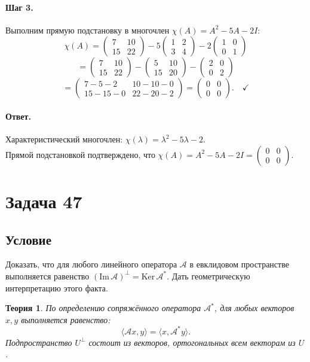 \documentclass[12pt,a4paper]{article}
\theoremstyle{solution}
\newtheorem*{theory}{Теория}
\newcommand{\task}[1]{\newpage\section*{Задача #1}}
\newcommand{\answer}{\paragraph{Ответ.}}
\newcommand{\step}[1]{\paragraph{Шаг #1.}}
\begin{document}
\step{3} Выполним прямую подстановку в многочлен $\chi(A) = A^2 - 5A - 2I$:
\[
\chi(A) = \begin{pmatrix} 7 & 10 \\ 15 & 22 \end{pmatrix} - 5 \begin{pmatrix} 1 & 2 \\ 3 & 4 \end{pmatrix} - 2 \begin{pmatrix} 1 & 0 \\ 0 & 1 \end{pmatrix}
\]
\[
= \begin{pmatrix} 7 & 10 \\ 15 & 22 \end{pmatrix} - \begin{pmatrix} 5 & 10 \\ 15 & 20 \end{pmatrix} - \begin{pmatrix} 2 & 0 \\ 0 & 2 \end{pmatrix}
\]
\[
= \begin{pmatrix} 7 - 5 - 2 & 10 - 10 - 0 \\ 15 - 15 - 0 & 22 - 20 - 2 \end{pmatrix} = \begin{pmatrix} 0 & 0 \\ 0 & 0 \end{pmatrix}. \quad\checkmark
\]

\answer
Характеристический многочлен: $\chi(\lambda) = \lambda^2 - 5\lambda - 2$. \\
Прямой подстановкой подтверждено, что $\chi(A) = A^2 - 5A - 2I = \begin{pmatrix} 0 & 0 \\ 0 & 0 \end{pmatrix}$.

\task{47}
\subsection*{Условие}
Доказать, что для любого линейного оператора $\mathcal{A}$ в евклидовом пространстве выполняется равенство $(\mathrm{Im}\,\mathcal{A})^\perp = \mathrm{Ker}\,\mathcal{A}^*$. Дать геометрическую интерпретацию этого факта.

\begin{theory}
По определению сопряжённого оператора $\mathcal{A}^*$, для любых векторов $x, y$ выполняется равенство:
\[
\langle \mathcal{A}x, y\rangle = \langle x, \mathcal{A}^* y\rangle.
\]
Подпространство $U^\perp$ состоит из векторов, ортогональных всем векторам из $U$.
\end{theory}
\end{document}
